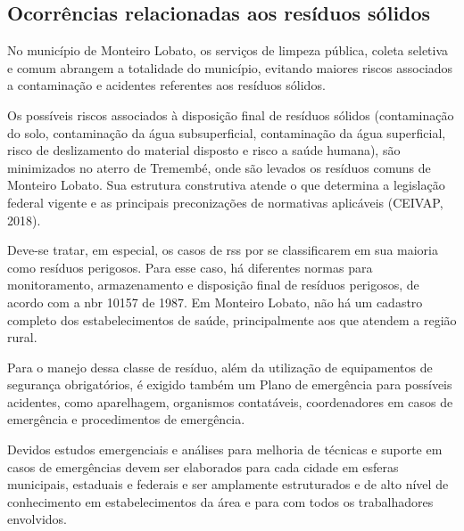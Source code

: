 	\subsection{Ocorrências relacionadas aos resíduos sólidos}
	No município de Monteiro Lobato, os serviços de limpeza pública, coleta seletiva e comum abrangem a totalidade do município, evitando maiores riscos associados a contaminação e acidentes referentes aos resíduos sólidos.

	Os possíveis riscos associados à disposição final de resíduos sólidos (contaminação do solo, contaminação da água subsuperficial, contaminação da água superficial, risco de deslizamento do material disposto e risco a saúde humana), são minimizados no aterro de Tremembé, onde são levados os resíduos comuns de Monteiro Lobato. Sua estrutura construtiva atende o que determina a legislação federal vigente e as principais preconizações de normativas aplicáveis (CEIVAP, 2018).

	Deve-se tratar, em especial, os casos de \gls{rss} por se classificarem em sua maioria como resíduos perigosos. Para esse caso, há diferentes normas para monitoramento, armazenamento e disposição final de resíduos perigosos, de acordo com a \gls{nbr} 10157 de 1987. Em Monteiro Lobato, não há um cadastro completo dos estabelecimentos de saúde, principalmente aos que atendem a região rural.

	Para o manejo dessa classe de resíduo, além da utilização de equipamentos de segurança obrigatórios, é exigido também um Plano de emergência para possíveis acidentes, como aparelhagem, organismos contatáveis, coordenadores em casos de emergência e procedimentos de emergência.

	Devidos estudos emergenciais e análises para melhoria de técnicas e suporte em casos de emergências devem ser elaborados para cada cidade em esferas municipais, estaduais e federais e ser amplamente estruturados e de alto nível de conhecimento em estabelecimentos da área e para com todos os trabalhadores envolvidos.
